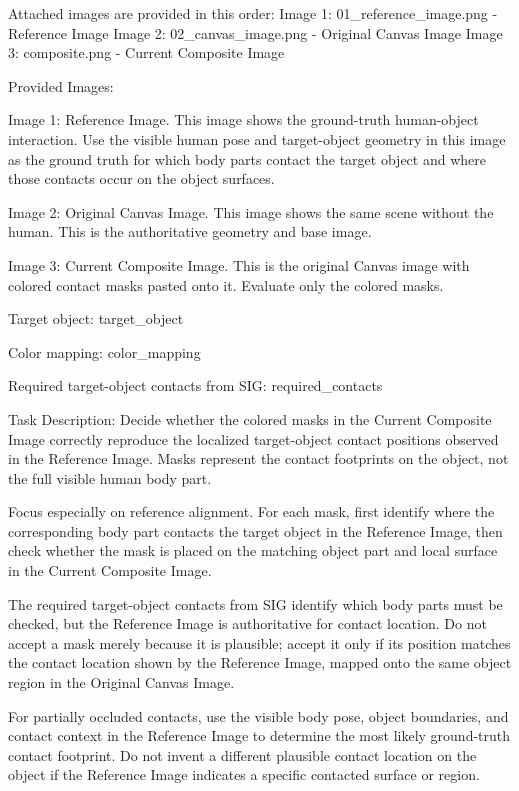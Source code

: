 \begin{promptblock}
Attached images are provided in this order:
Image 1: 01_reference_image.png - Reference Image
Image 2: 02_canvas_image.png - Original Canvas Image
Image 3: composite.png - Current Composite Image

Provided Images:

Image 1: Reference Image.
This image shows the ground-truth human-object interaction. Use the visible human pose and target-object geometry in this image as the ground truth for which body parts contact the target object and where those contacts occur on the object surfaces.

Image 2: Original Canvas Image.
This image shows the same scene without the human. This is the authoritative geometry and base image.

Image 3: Current Composite Image.
This is the original Canvas image with colored contact masks pasted onto it. Evaluate only the colored masks.

Target object:
{target_object}

Color mapping:
{color_mapping}

Required target-object contacts from SIG:
{required_contacts}

Task Description:
Decide whether the colored masks in the Current Composite Image correctly reproduce the localized target-object contact positions observed in the Reference Image. Masks represent the contact footprints on the object, not the full visible human body part.

Focus especially on reference alignment. For each mask, first identify where the corresponding body part contacts the target object in the Reference Image, then check whether the mask is placed on the matching object part and local surface in the Current Composite Image.

The required target-object contacts from SIG identify which body parts must be checked, but the Reference Image is authoritative for contact location. Do not accept a mask merely because it is plausible; accept it only if its position matches the contact location shown by the Reference Image, mapped onto the same object region in the Original Canvas Image.

For partially occluded contacts, use the visible body pose, object boundaries, and contact context in the Reference Image to determine the most likely ground-truth contact footprint. Do not invent a different plausible contact location on the object if the Reference Image indicates a specific contacted surface or region.


\end{promptblock}
